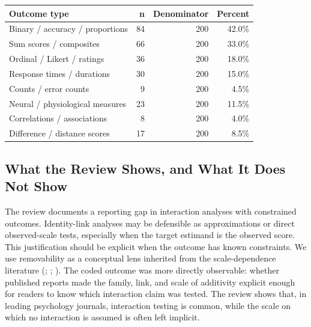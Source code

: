 \documentclass[
  man,
  longtable,
  nolmodern,
  notxfonts,
  notimes,
  colorlinks=true,linkcolor=blue,citecolor=blue,urlcolor=blue]{apa7}
\begin{document}
\begin{table}

{\caption{{Broad response-variable categories in interaction-testing
articles. Categories are non-exclusive, so one article can contribute to
more than one row.}{\label{tbl-review-outcome-types}}}
\vspace{-20pt}}

\begin{longtable}[]{@{}lrrr@{}}
\toprule\noalign{}
Outcome type & n & Denominator & Percent \\
\midrule\noalign{}
\endhead
\bottomrule\noalign{}
\endlastfoot
Binary / accuracy / proportions & 84 & 200 & 42.0\% \\
Sum scores / composites & 66 & 200 & 33.0\% \\
Ordinal / Likert / ratings & 36 & 200 & 18.0\% \\
Response times / durations & 30 & 200 & 15.0\% \\
Counts / error counts & 9 & 200 & 4.5\% \\
Neural / physiological measures & 23 & 200 & 11.5\% \\
Correlations / associations & 8 & 200 & 4.0\% \\
Difference / distance scores & 17 & 200 & 8.5\% \\
\end{longtable}

\end{table}

\subsection{What the Review Shows, and What It Does Not
Show}\label{what-the-review-shows-and-what-it-does-not-show}

The review documents a reporting gap in interaction analyses with
constrained outcomes. Identity-link analyses may be defensible as
approximations or direct observed-scale tests, especially when the
target estimand is the observed score. This justification should be
explicit when the outcome has known constraints. We use removability as
a conceptual lens inherited from the scale-dependence literature
(; ; ). The
coded outcome was more directly observable: whether published reports
made the family, link, and scale of additivity explicit enough for
readers to know which interaction claim was tested. The review shows
that, in leading psychology journals, interaction testing is common,
while the scale on which no interaction is assumed is often left
implicit.
\end{document}
